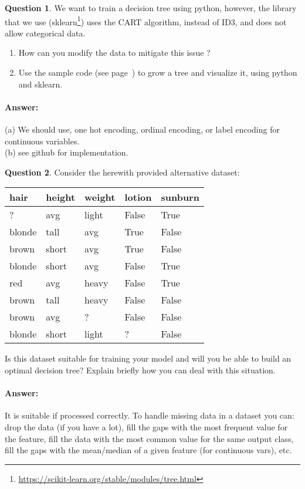 \documentclass[11pt,a4paper]{article}
\theoremstyle{definition}%
\newtheorem{Q}{Question}[] %
\newcommand{\reponse}[1]{%
\ifthenelse {\boolean{corrige}} {\paragraph{Answer:} \color{darkblue}   #1\color{black}} {}
}
\begin{document}
\begin{Q}
    We want to train a decision tree using python, however, the library that we use 
    (sklearn\footnote{\url{https://scikit-learn.org/stable/modules/tree.html}}) uses
    the CART algorithm, instead of ID3, and does not allow categorical data.
    \begin{enumerate}
        \item How can you modify the data to mitigate this issue ?
        \item Use the sample code (see page~\pageref{source}) to grow a tree and visualize it, using python and sklearn.
    \end{enumerate}
    \reponse{
        (a) We should use, one hot encoding, ordinal encoding, or label encoding for continuous variables.\\
        (b) see github for implementation.
    }
\end{Q}

\begin{Q}
    Consider the herewith provided alternative dataset:
    \begin{center}
\begin{tabular}{|l|l|l|l|l|}
\hline
\textbf{hair} & \textbf{height} & \textbf{weight} & \textbf{lotion} & \textbf{sunburn} \\ \hline
?             & avg             & light           & False           & True             \\ \hline
blonde        & tall            & avg             & True            & False            \\ \hline
brown         & short           & avg             & True            & False            \\ \hline
blonde        & short           & avg             & False           & True             \\ \hline
red           & avg             & heavy           & False           & True             \\ \hline
brown         & tall            & heavy           & False           & False            \\ \hline
brown         & avg             & ?               & False           & False            \\ \hline
blonde        & short           & light           & ?               & False            \\ \hline
\end{tabular}
    \end{center}
    Is this dataset suitable for training your model and will you be able to build an optimal decision
    tree? Explain briefly how you can deal with this situation.

    \reponse{
        It is suitable if processed correctly. To handle missing data in a dataset you can: 
        drop the data (if you have a lot), fill the gaps with the most frequent value for the feature,
        fill the data with the most common value for the same output class,
        fill the gaps with the mean/median of a given feature (for continuous vars), etc. 
    }
\end{Q}
\end{document}

